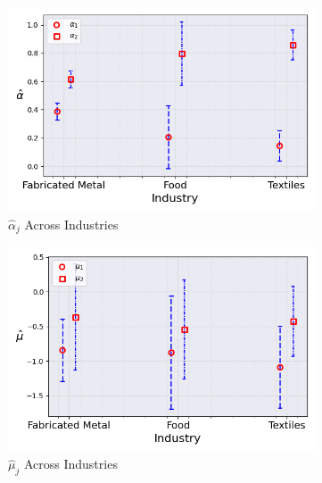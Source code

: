 \documentclass{article}
\begin{document}
\begin{figure}[ht!]
    \centering 
    \caption{AR(1) Normal Model with $\log K$, Import and CIIU Across Industries ($M_0 = 2$)}
    \begin{subfigure}[t]{0.32\textwidth}
        \centering
        \includegraphics[width=\textwidth]{figure/ar1_normal_kmshare_ciiu_alpha_across_industries_m2.png}
        \caption{$\hat\alpha_j$ Across Industries}
    \end{subfigure}
    \begin{subfigure}[t]{0.32\textwidth}
        \centering
        \includegraphics[width=\textwidth]{figure/ar1_normal_kmshare_ciiu_mu_across_industries_m2.png}
        \caption{$\hat\mu_j$ Across Industries}
    \end{subfigure}
    \begin{subfigure}[t]{0.32\textwidth}

\end{subfigure}
\end{figure}
\end{document}
